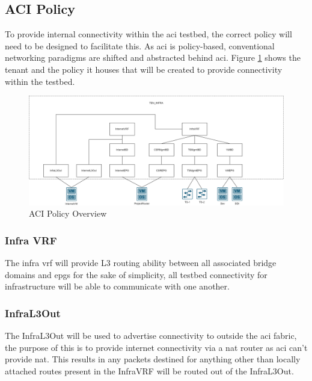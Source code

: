 \subsection{ACI Policy}
\label{design:Testbed:network-design:aci-policy}
To provide internal
connectivity within the \gls{aci} testbed, the correct policy will need to be
designed to facilitate this. As \gls{aci} is policy-based, conventional
networking paradigms are shifted and abstracted behind \gls{aci}. Figure
\ref{fig:epg-topology} shows the tenant and the policy it houses that will be
created to provide connectivity within the testbed.

\begin{figure}[H]

    \centering
    \includegraphics[scale=0.17]{images/epg-topology.png}

    \caption{ACI Policy Overview}
    \label{fig:epg-topology}
\end{figure}

\subsubsection{Infra VRF}
The infra \gls{vrf} will provide L3 routing ability
between all associated bridge domains and \gls{epg}s for the sake of
simplicity, all testbed connectivity for infrastructure will be able to
communicate with one another.

\subsubsection{InfraL3Out}
The InfraL3Out will
be used to advertise connectivity to outside the \gls{aci} fabric, the purpose
of this is to provide internet connectivity via a \gls{nat} router as \gls{aci}
can't provide \gls{nat}. This results in any packets destined for anything
other than locally attached routes present in the InfraVRF will be routed out
of the InfraL3Out.

